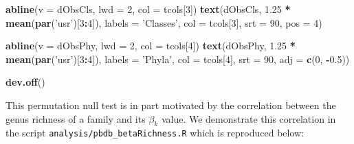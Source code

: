 \documentclass[]{article}
\newenvironment{Shaded}{\begin{snugshade}}{\end{snugshade}}
\newcommand{\KeywordTok}[1]{\textcolor[rgb]{0.13,0.29,0.53}{\textbf{#1}}}
\newcommand{\DataTypeTok}[1]{\textcolor[rgb]{0.13,0.29,0.53}{#1}}
\newcommand{\DecValTok}[1]{\textcolor[rgb]{0.00,0.00,0.81}{#1}}
\newcommand{\FloatTok}[1]{\textcolor[rgb]{0.00,0.00,0.81}{#1}}
\newcommand{\StringTok}[1]{\textcolor[rgb]{0.31,0.60,0.02}{#1}}
\newcommand{\OperatorTok}[1]{\textcolor[rgb]{0.81,0.36,0.00}{\textbf{#1}}}
\newcommand{\NormalTok}[1]{#1}
\begin{document}
\begin{Shaded}
\begin{Highlighting}[]
\KeywordTok{abline}\NormalTok{(}\DataTypeTok{v =}\NormalTok{ dObsCls, }\DataTypeTok{lwd =} \DecValTok{2}\NormalTok{, }\DataTypeTok{col =}\NormalTok{ tcols[}\DecValTok{3}\NormalTok{])}
\KeywordTok{text}\NormalTok{(dObsCls, }\FloatTok{1.25} \OperatorTok{*}\StringTok{ }\KeywordTok{mean}\NormalTok{(}\KeywordTok{par}\NormalTok{(}\StringTok{'usr'}\NormalTok{)[}\DecValTok{3}\OperatorTok{:}\DecValTok{4}\NormalTok{]), }\DataTypeTok{labels =} \StringTok{'Classes'}\NormalTok{, }\DataTypeTok{col =}\NormalTok{ tcols[}\DecValTok{3}\NormalTok{],}
     \DataTypeTok{srt =} \DecValTok{90}\NormalTok{, }\DataTypeTok{pos =} \DecValTok{4}\NormalTok{)}

\KeywordTok{abline}\NormalTok{(}\DataTypeTok{v =}\NormalTok{ dObsPhy, }\DataTypeTok{lwd =} \DecValTok{2}\NormalTok{, }\DataTypeTok{col =}\NormalTok{ tcols[}\DecValTok{4}\NormalTok{])}
\KeywordTok{text}\NormalTok{(dObsPhy, }\FloatTok{1.25} \OperatorTok{*}\StringTok{ }\KeywordTok{mean}\NormalTok{(}\KeywordTok{par}\NormalTok{(}\StringTok{'usr'}\NormalTok{)[}\DecValTok{3}\OperatorTok{:}\DecValTok{4}\NormalTok{]), }\DataTypeTok{labels =} \StringTok{'Phyla'}\NormalTok{, }\DataTypeTok{col =}\NormalTok{ tcols[}\DecValTok{4}\NormalTok{],}
     \DataTypeTok{srt =} \DecValTok{90}\NormalTok{, }\DataTypeTok{adj =} \KeywordTok{c}\NormalTok{(}\DecValTok{0}\NormalTok{, }\OperatorTok{-}\FloatTok{0.5}\NormalTok{))}

\KeywordTok{dev.off}\NormalTok{()}
\end{Highlighting}
\end{Shaded}

This permutation null test is in part motivated by the correlation
between the genus richness of a family and its \(\beta_k\) value. We
demonstrate this correlation in the script
\texttt{analysis/pbdb\_betaRichness.R} which is reproduced below:
\end{document}
